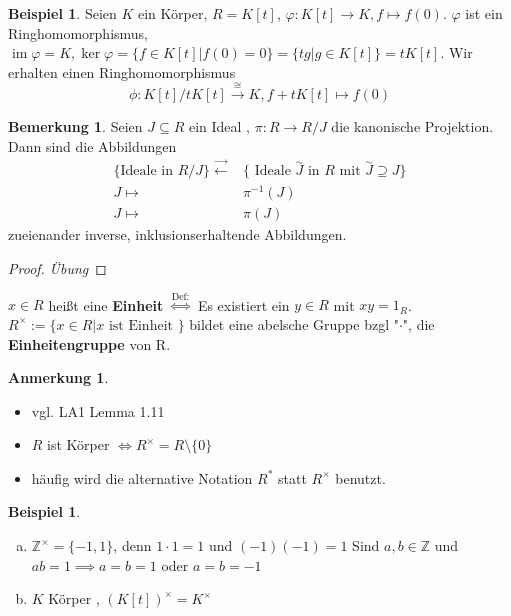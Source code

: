 \documentclass[a4paper, titlepage]{article}
\theoremstyle{definition}
\newtheorem{bsp}[satz]{Beispiel}
\newtheorem{bem}[satz]{Bemerkung}
\newtheorem*{anm}{Anmerkung}
\newcommand{\Z}{\mathbb{Z}}
\begin{document}
\begin{bsp}
	Seien $K$ ein Körper, $R=K[t]$, $\varphi:K[t]\longrightarrow K, f \mapsto f(0)$. 
	$\varphi$ ist ein Ringhomomorphismus, $\operatorname{im}\varphi= K, \operatorname{ker}\varphi=\{f\in K[t]|f(0)=0\}=\{tg|g\in K[t]\}=tK[t]$. Wir erhalten einen Ringhomomorphismus 
	$$	\phi:K[t]/tK[t] \overset{\cong}{\longrightarrow} K, f+tK[t]\mapsto f(0)$$
\end{bsp}
\begin{bem}
	Seien $J \subseteq R$ ein Ideal , $\pi: R \longrightarrow R/J$ die kanonische Projektion. Dann sind die Abbildungen
	\begin{align*}
	\{\text{Ideale in }R/J\} \overset{\longrightarrow}{\longleftarrow}&\{\text{ Ideale }\overset{\sim}{J}\text{ in }R \text{ mit } \overset{\sim}{J}\supseteq J\}\\
	J\longmapsto&\pi^{-1}(J)\\
	J\longmapsto& \pi(J)
	\end{align*}
	zueienander inverse, inklusionserhaltende Abbildungen.
\end{bem}
\begin{proof}
	\textit{Übung}
\end{proof}
\begin{definition}
	$x\in R$ heißt eine \textbf{Einheit} $\overset{\text{Def:}}{\Leftrightarrow}$ Es existiert ein  $y\in R$ mit $xy=1_R$.
	$R^{\times}:=\{x\in R| x \text{ ist Einheit }\}$ bildet eine abelsche Gruppe bzgl "$\cdot$", die \textbf{Einheitengruppe} von R.
\end{definition}
\begin{anm}
\begin{itemize}
	\item vgl. LA1 Lemma 1.11 
	\item $R$ ist Körper $\Leftrightarrow R^{\times}=R\setminus \{0\}$
	\item häufig wird die alternative Notation $R^{*}$ statt $R^{\times}$ benutzt.
\end{itemize}
\end{anm}
\begin{bsp}
	\begin{enumerate}[(a)]
		\item $\Z^{\times}=\{-1,1\}$, denn $1\cdot 1= 1$ und $(-1)(-1)=1$
		Sind $a,b\in \Z$ und $ab=1 \implies a=b=1$ oder $a=b=-1$
		\item $K$ Körper , $(K[t])^{\times}=K^{\times}$
	\end{enumerate}
\end{bsp}
\newpage
\end{document}
